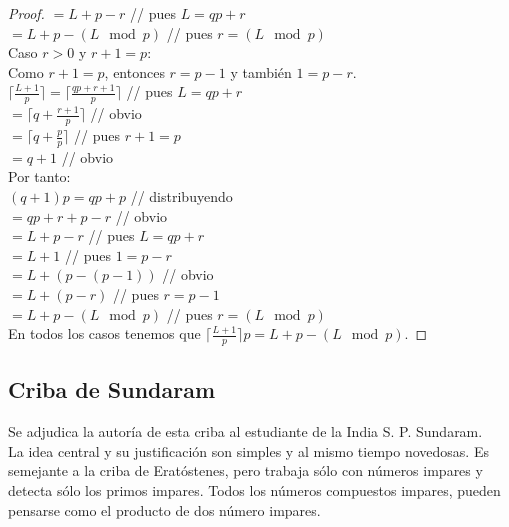 \begin{proof}
$= L+p-r$  \; \; \; \;  \; \; \; \;  \; \; \; \;  \; \; \; \; // pues $L = qp+r$  \\
$= L+p - (L \mod p)$  \; \; \; \;  \; \; \; \; // pues $r = (L \mod p)$  \\
Caso $r>0$ y $r+1=p$: \\
Como $r+1=p$, entonces $r=p-1$ y también $1=p-r$.\\
$\lceil \frac{L+1}{p} \rceil = \lceil \frac{qp+r+1}{p} \rceil$  \; \; \; \;  \; \; \; \;  \; \; \; \; // pues $L = qp+r$ \\
$= \lceil q + \frac{r+1}{p} \rceil$  \; \; \; \;  \; \; \; \;  \; \; \; \;  \; \; \; \; \; // obvio \\
$= \lceil q + \frac{p}{p} \rceil$  \; \; \; \;  \; \; \; \;  \; \; \; \;  \; \; \; \;  \; \;  // pues $r+1=p$  \\
$= q+1$  \; \; \; \;  \; \; \; \;  \; \; \; \;  \; \; \; \;  \; \; \; \; // obvio \\
Por tanto:\\
$(q+1)p = qp+p$  \; \; \; \;  \; \; \; \;  \; \; \; \; // distribuyendo  \\
$= qp+r+p-r$  \; \; \; \;  \; \; \; \;  \; \; \; \;  \; // obvio  \\
$= L+p-r$  \; \; \; \;  \; \; \; \;  \; \; \; \;  \; \; \; \; \; // pues $L = qp+r$  \\
$= L+1$ \; \; \; \;  \; \; \; \;  \; \; \; \;  \; \; \; \;  \; \; \; \;  // pues $1=p-r$  \\
$= L+ (p-(p-1))$  \; \; \; \;  \; \; \; \;  \; \; \; // obvio  \\
$= L+ (p-r)$  \; \; \; \;  \; \; \; \;  \; \; \; \;  \; \; \; \; // pues $r=p-1$  \\
$= L+p - (L \mod p)$  \; \; \; \;  \; \; \; \;  \; // pues $r = (L \mod p)$  \\
En todos los casos tenemos que $\lceil \frac{L+1}{p} \rceil p = L+p - (L \mod p)$.
\end{proof}

\subsection{Criba de Sundaram}
Se adjudica la autoría de esta criba al estudiante de la India S. P. Sundaram.\\
La idea central y su justificación son simples y al mismo tiempo novedosas.
Es semejante a la criba de Eratóstenes, pero trabaja sólo con números impares y detecta sólo los primos impares.
Todos los números compuestos impares, pueden pensarse como el producto de dos número impares.

